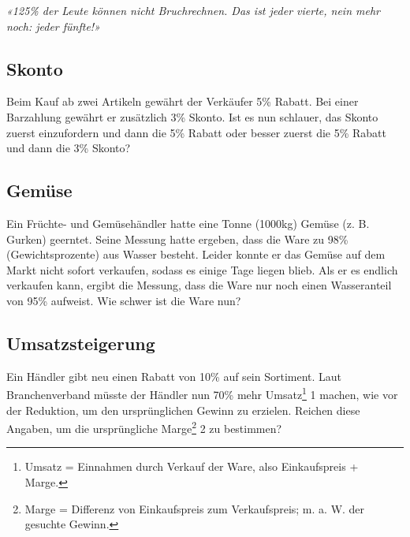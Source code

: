 \begin{center}\textit{«125\% der Leute können nicht Bruchrechnen. Das ist jeder vierte, nein mehr
noch: jeder fünfte!»}\end{center}


\subsection{Skonto}

Beim Kauf ab zwei Artikeln gewährt der Verkäufer 5\% Rabatt. Bei einer
Barzahlung gewährt er zusätzlich 3\% Skonto. Ist es nun schlauer, das Skonto
zuerst einzufordern und dann die 5\% Rabatt oder besser zuerst die 5\% Rabatt
und dann die 3\% Skonto?

\TNTeop{}

\subsection{Gemüse}
Ein Früchte- und Gemüsehändler hatte eine Tonne (1000kg) Gemüse (z. B.
Gurken) geerntet. Seine Messung hatte ergeben, dass die Ware zu 98\%\,
(Gewichtsprozente) aus Wasser besteht.
Leider konnte er das Gemüse auf dem Markt nicht sofort verkaufen, sodass es
einige Tage liegen blieb. Als er es endlich verkaufen kann, ergibt die Messung,
dass die Ware nur noch einen Wasseranteil von 95\% aufweist.
Wie schwer ist die Ware nun?

\TNTeop{}

\subsection{Umsatzsteigerung}
Ein Händler gibt neu einen Rabatt von 10\% auf sein Sortiment. Laut
Branchenverband müsste der Händler nun 70\% mehr Umsatz\footnote{Umsatz = Einnahmen durch Verkauf der Ware, also Einkaufspreis + Marge.} 1 machen, wie vor
der Reduktion, um den ursprünglichen Gewinn zu erzielen.
Reichen diese Angaben, um die ursprüngliche Marge\footnote{Marge = Differenz von Einkaufspreis zum Verkaufspreis; m. a. W. der gesuchte
Gewinn.} 2 zu bestimmen?

\newpage


